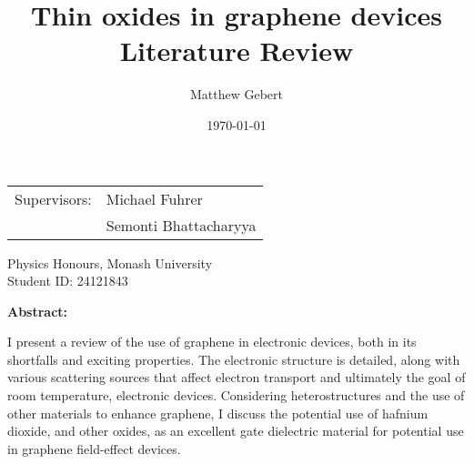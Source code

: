 \documentclass{article}
\title{\myTitle Thin oxides in graphene devices\\\vspace{5mm}\Large Literature Review}
\date{\today}
\author{Matthew Gebert}
\begin{document}
	\maketitle
	\begin{flushleft}
		\hrulefill
	\end{flushleft}
	\begin{tabularx}{\textwidth}{Xl}
		Supervisors:&Michael Fuhrer\\
		&Semonti Bhattacharyya
	\end{tabularx}\newline
	\begin{flushleft}
		\hrulefill
	\end{flushleft}
	
	\begin{center}
		Physics Honours, Monash University\\Student ID: 24121843\\
	\end{center}
	\vspace{1in}
	
	\begin{center}
		\large\textbf{Abstract:}
	\end{center}
	
	I present a review of the use of graphene in electronic devices, both in its shortfalls and exciting properties. The electronic structure is detailed, along with various scattering sources that affect electron transport and ultimately the goal of room temperature, electronic devices. Considering heterostructures and the use of other materials to enhance graphene, I discuss the potential use of hafnium dioxide, and other oxides, as an excellent gate dielectric material for potential use in graphene field-effect devices.
	\newpage 
	\renewcommand{\baselinestretch}{0.94}\normalsize
	\tableofcontents
	\renewcommand{\baselinestretch}{1}\normalsize
	
	
	
	


\end{document}
